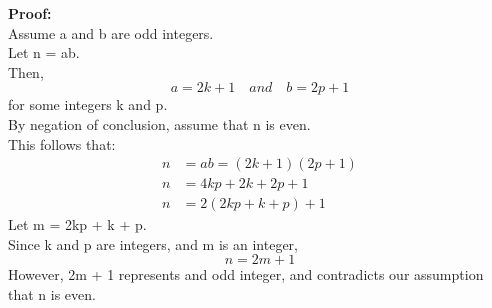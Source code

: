 \documentclass{book}
\begin{document}
\textbf{Proof:} \\
Assume a and b are odd integers. \\
Let n = ab. \\
Then, \\
\begin{equation*}
    a = 2k + 1 \quad and \quad b = 2p + 1
\end{equation*}
for some integers k and p. \\
By negation of conclusion, assume that n is even. \\
This follows that: \\
\begin{equation*}
\begin{split}
    n & = ab = (2k + 1)(2p + 1) \\
    n & = 4kp + 2k + 2p + 1 \\
    n & = 2(2kp + k + p) + 1
\end{split}
\end{equation*}
Let m = 2kp + k + p. \\
Since k and p are integers, and m is an integer, \\
\begin{equation*}
    n = 2m + 1
\end{equation*}
However, 2m + 1 represents and odd integer, and contradicts our assumption that n is even. \\

\vspace{1em}
\end{document}
